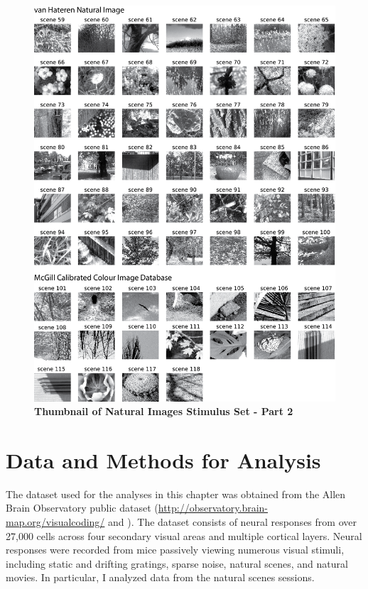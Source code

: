\begin{figure}
  \centering
   \includegraphics[width=\textwidth,height=0.9\textheight,keepaspectratio]{Figures/chapter5/images_dataset2.png}
  \caption[Thumbnail of Natural Images Stimulus Set - Part 2]{\textbf{Thumbnail of Natural Images Stimulus Set - Part 2} }
   \label{fig:images2}
\end{figure}
\section{Data and Methods for Analysis}
The dataset used for the analyses in this chapter was obtained from the Allen Brain Observatory public dataset (\url{http://observatory.brain-map.org/visualcoding/} and \textcite{Hawrylycz2016}). The dataset consists of neural responses from over 27,000 cells across four secondary visual areas and multiple cortical layers. Neural responses were recorded from mice passively viewing numerous visual stimuli, including static and drifting gratings, sparse noise, natural scenes, and natural movies. In particular, I analyzed data from the natural scenes sessions. 

